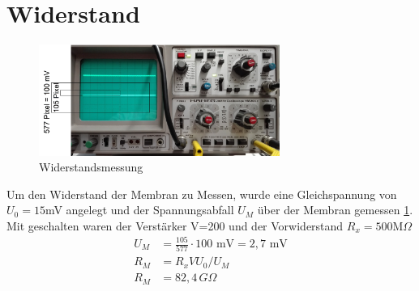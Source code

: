 \documentclass{include/thesisclass3}
\begin{document}
\section{Widerstand}
\begin{figure}[ht]
	\begin{center}
		\includegraphics[width=0.7\textwidth]{images/Widerstand.png}
		\caption{Widerstandsmessung}
		\label{resistance}
	\end{center}
\end{figure}
Um den Widerstand der Membran zu Messen, wurde eine Gleichspannung von $U_0=15$mV angelegt und der Spannungsabfall $U_M$ über der Membran gemessen \ref{resistance}. Mit geschalten waren der Verstärker V=200 und der Vorwiderstand $R_x=500\text{M}\Omega$
\begin{align*}
	U_M&=\frac{105}{577}\cdot 100\text{ mV}= 2,7 \text{ mV}\\
	R_M&=R_x V U_0/U_M\\
	R_M&=82,4 \,G\Omega
\end{align*}
\end{document}
